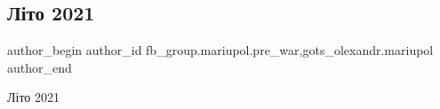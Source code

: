  
 
 
 
 

\subsection{Літо 2021}
\label{sec:14_02_2023.fb.fb_group.mariupol.pre_war.5.l_to_2021}
 
\ifcmt
 author_begin
   author_id fb_group.mariupol.pre_war,gots_olexandr.mariupol
 author_end
\fi

Літо 2021

